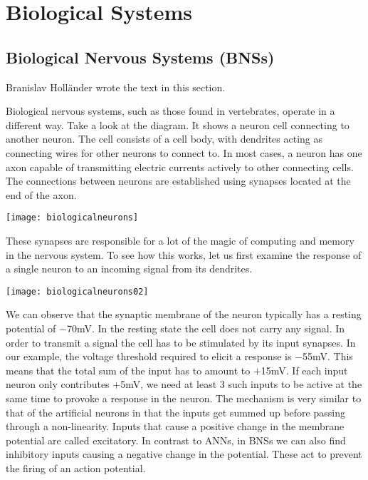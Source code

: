 
\chapter{Biological Systems}



\section{Biological Nervous Systems (BNSs)}

Branislav Holl\"{a}nder \cite{Hollander2018} wrote the text in this section.

Biological nervous systems, such as those found in vertebrates, operate in a different way. Take a look at the diagram. It shows a neuron cell connecting to another neuron. The cell consists of a cell body, with dendrites acting as connecting wires for other neurons to connect to. In most cases, a neuron has one axon capable of transmitting electric currents actively to other connecting cells. The connections between neurons are established using synapses located at the end of the axon. 
\begin{marginfigure}
\texttt{[image: biologicalneurons]}
\end{marginfigure}

These synapses are responsible for a lot of the magic of computing and memory in the nervous system. To see how this works, let us first examine the response of a single neuron to an incoming signal from its dendrites\cite{Synaptidude2005}.
\begin{marginfigure}
\texttt{[image: biologicalneurons02]}
\end{marginfigure}
We can observe that the synaptic membrane of the neuron typically has a resting potential of $-$70mV. In the resting state the cell does not carry any signal. In order to transmit a signal the cell has to be stimulated by its input synapses. In our example, the voltage threshold required to elicit a response is $-$55mV. This means that the total sum of the input has to amount to $+$15mV. If each input neuron only contributes $+$5mV, we need at least 3 such inputs to be active at the same time to provoke a response in the neuron. The mechanism is very similar to that of the artificial neurons in that the inputs get summed up before passing through a non-linearity. Inputs that cause a positive change in the membrane potential are called excitatory. In contrast to ANNs, in BNSs we can also find inhibitory inputs causing a negative change in the potential. These act to prevent the firing of an action potential.

